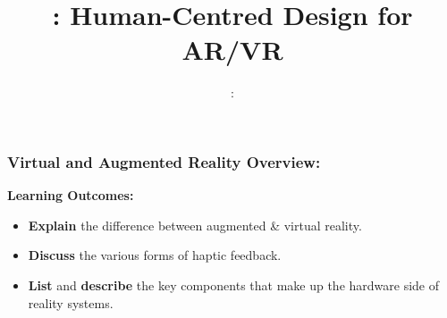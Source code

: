 \usepackage{../../beamerthemeFalmouthGamesAcademy}
\usepackage{multimedia}
\usepackage{soul}
\usepackage{tikz}
\usepackage{enumitem}
\usepackage{verbatim}
\graphicspath{ {../../} }


\usepackage[normalem]{ulem}
\usepackage{wasysym}

\usepackage{pdfpages}

\usetikzlibrary{arrows,automata}



\def\signed #1{{\leavevmode\unskip\nobreak\hfil\penalty50\hskip2em
  \hbox{}\nobreak\hfil(#1)%
  \parfillskip=0pt \finalhyphendemerits=0 \endgraf}}

\newsavebox\mybox
\newenvironment{aquote}[1]
  {\savebox\mybox{#1}\begin{quote}}
  {\signed{\usebox\mybox}\end{quote}}



\title{\sessionnumber: \normalsize{Human-Centred Design for AR/VR}}
\subtitle{\modulecode: \moduletitle}

\frame{\titlepage} 
\begin{frame}
	\frametitle{Virtual and Augmented Reality Overview:}
	
	\textbf{Learning Outcomes:}
	
	\begin{itemize}
		\item \textbf{Explain} the difference between augmented \& virtual reality. 
		\item \textbf{Discuss} the various forms of haptic feedback.
		\item \textbf{List} and \textbf{describe} the key components that make up the hardware side of reality systems.	
	\end{itemize}
\end{frame}

